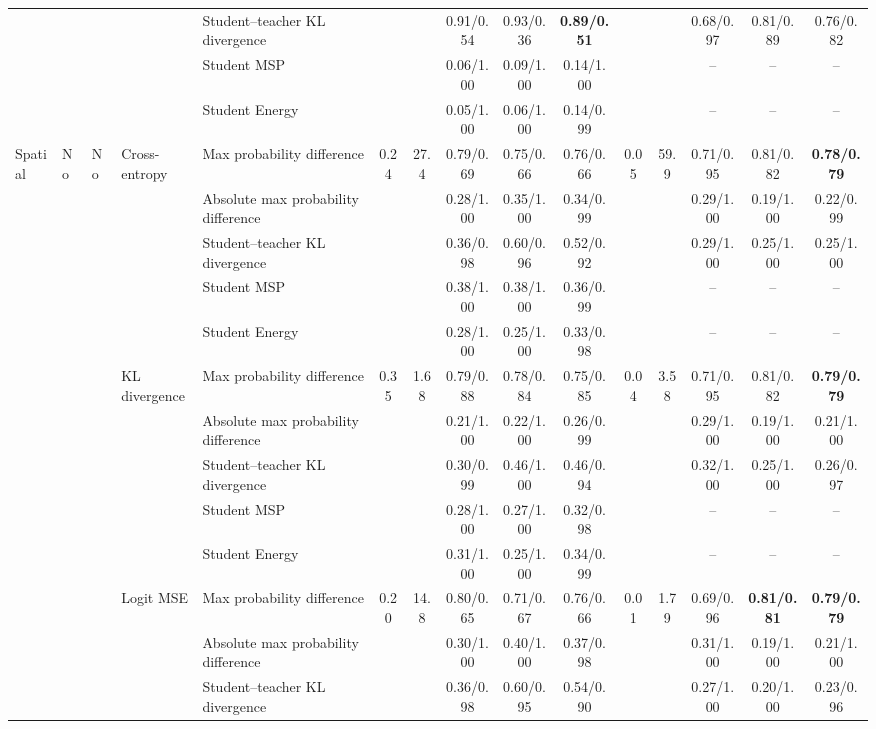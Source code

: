 \documentclass[border=2pt]{standalone}
\begin{document}
\begin{tabular}{lllllcccccccccc}
 &  &  &  & Student--teacher KL divergence &  &  & 0.91/0.54 & 0.93/0.36 & \textbf{0.89/0.51} &  &  & 0.68/0.97 & 0.81/0.89 & 0.76/0.82 \\
 &  &  &  & Student MSP &  &  & 0.06/1.00 & 0.09/1.00 & 0.14/1.00 &  &  & -- & -- & -- \\
 &  &  &  & Student Energy &  &  & 0.05/1.00 & 0.06/1.00 & 0.14/0.99 &  &  & -- & -- & -- \\
\addlinespace
Spatial & No & No & Cross-entropy & Max probability difference & 0.24 & 27.4 & 0.79/0.69 & 0.75/0.66 & 0.76/0.66 & 0.05 & 59.9 & 0.71/0.95 & 0.81/0.82 & \textbf{0.78/0.79} \\
 &  &  &  & Absolute max probability difference &  &  & 0.28/1.00 & 0.35/1.00 & 0.34/0.99 &  &  & 0.29/1.00 & 0.19/1.00 & 0.22/0.99 \\
 &  &  &  & Student--teacher KL divergence &  &  & 0.36/0.98 & 0.60/0.96 & 0.52/0.92 &  &  & 0.29/1.00 & 0.25/1.00 & 0.25/1.00 \\
 &  &  &  & Student MSP &  &  & 0.38/1.00 & 0.38/1.00 & 0.36/0.99 &  &  & -- & -- & -- \\
 &  &  &  & Student Energy &  &  & 0.28/1.00 & 0.25/1.00 & 0.33/0.98 &  &  & -- & -- & -- \\
 &  &  & KL divergence & Max probability difference & 0.35 & 1.68 & 0.79/0.88 & 0.78/0.84 & 0.75/0.85 & 0.04 & 3.58 & 0.71/0.95 & 0.81/0.82 & \textbf{0.79/0.79} \\
 &  &  &  & Absolute max probability difference &  &  & 0.21/1.00 & 0.22/1.00 & 0.26/0.99 &  &  & 0.29/1.00 & 0.19/1.00 & 0.21/1.00 \\
 &  &  &  & Student--teacher KL divergence &  &  & 0.30/0.99 & 0.46/1.00 & 0.46/0.94 &  &  & 0.32/1.00 & 0.25/1.00 & 0.26/0.97 \\
 &  &  &  & Student MSP &  &  & 0.28/1.00 & 0.27/1.00 & 0.32/0.98 &  &  & -- & -- & -- \\
 &  &  &  & Student Energy &  &  & 0.31/1.00 & 0.25/1.00 & 0.34/0.99 &  &  & -- & -- & -- \\
 &  &  & Logit MSE & Max probability difference & 0.20 & 14.8 & 0.80/0.65 & 0.71/0.67 & 0.76/0.66 & 0.01 & 1.79 & 0.69/0.96 & \textbf{0.81/0.81} & \textbf{0.79/0.79} \\
 &  &  &  & Absolute max probability difference &  &  & 0.30/1.00 & 0.40/1.00 & 0.37/0.98 &  &  & 0.31/1.00 & 0.19/1.00 & 0.21/1.00 \\
 &  &  &  & Student--teacher KL divergence &  &  & 0.36/0.98 & 0.60/0.95 & 0.54/0.90 &  &  & 0.27/1.00 & 0.20/1.00 & 0.23/0.96 \\

\end{tabular}
\end{document}
